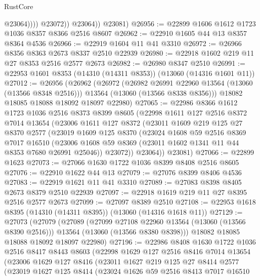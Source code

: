\begin{lexlean}{RustCore}
\begin{coremodule}
                      @23064))))
              @23072))
          @23064))
      @23081)
@26956 := @22899 @1606 @1612 @1723 @1036 @8357 @8366 @2516 @8607
@26962 := @22910 @1605 @44 @13 @8357 @8364 @4536
@26966 := @22919 @1604 @11 @41 @3310
@26972 := @26966 @8356 @8363 @2673 @8337 @2510 @22939
@26980 := @22918 @1602 @219 @11 @27 @8353 @2516 @2577 @2673
@26982 := @26980 @8347 @2510
@26991 := @22953 @1601 @8353 (@14310 (@14311 @8353)) (@13060 (@14316 @1601 @11))
@27012 := @26956
    (@26962
      (@26972
        (@26982 @26991 @22960 @13564 (@13060 (@13566 @8348 @2516)))
        @13564
        (@13060 (@13566 @8338 @8356)))
      @18082
      @18085
      @18088
      @18092
      @18097
      @22980)
@27065 := @22986
    @8366
    @1612
    @1723
    @1036
    @2516
    @8373
    @8399
    @8605
    (@22998
      @1611
      @127
      @2516
      @8372
      @7014
      @13654
      (@23006
        @1611
        @127
        @8372
        (@23011
          @1609
          @219
          @125
          @27
          @8370
          @2577
          (@23019
            @1609
            @125
            @8370
            (@23024
              @1608
              @59
              @2516
              @8369
              @7017
              @16510
              (@23006 @1608 @59 @8369 (@23011 @1602 @1341 @11 @44 @8353 @7680 @26991 @25046))
              @23072))
          @23064))
      @23081)
@27066 := @22899 @1623
@27073 := @27066 @1630 @1722 @1036 @8399 @8408 @2516 @8605
@27076 := @22910 @1622 @44 @13
@27079 := @27076 @8399 @8406 @4536
@27083 := @22919 @1621 @11 @41 @3310
@27089 := @27083 @8398 @8405 @2673 @8379 @2510 @22939
@27097 := @22918 @1619 @219 @11 @27 @8395 @2516 @2577 @2673
@27099 := @27097 @8389 @2510
@27108 := @22953 @1618 @8395 (@14310 (@14311 @8395)) (@13060 (@14316 @1618 @11))
@27129 := @27073
    (@27079
      (@27089
        (@27099 @27108 @22960 @13564 (@13060 (@13566 @8390 @2516)))
        @13564
        (@13060 (@13566 @8380 @8398)))
      @18082
      @18085
      @18088
      @18092
      @18097
      @22980)
@27196 := @22986
    @8408
    @1630
    @1722
    @1036
    @2516
    @8417
    @8443
    @8603
    (@22998
      @1629
      @127
      @2516
      @8416
      @7014
      @13654
      (@23006
        @1629
        @127
        @8416
        (@23011
          @1627
          @219
          @125
          @27
          @8414
          @2577
          (@23019
            @1627
            @125
            @8414
            (@23024
              @1626
              @59
              @2516
              @8413
              @7017
              @16510

\end{coremodule}
\end{lexlean}
